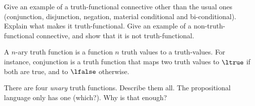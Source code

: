 \documentclass[../../../include/open-logic-section]{subfiles}
\begin{document}


\begin{prob}
    \citep[1.1 item 1]{MacFarlane-2020-PhilosophicalLogicContemporary}
    Give an example of a truth-functional connective other than the
usual ones (conjunction, disjunction, negation, material conditional
and bi-conditional). Explain what makes it truth-functional. Give an
example of a non-truth-functional connective, and show that it is not
truth-functional.
\end{prob}

\begin{prob}
    A $n$-ary truth function is a function $n$ truth values to
    a truth-values. For instance, conjunction is a truth function that
    maps two truth values to $\ltrue$ if both are true, and to $\lfalse$
    otherwise.

    There are four \emph{unary} truth functions. Describe them all. 
    The propositional language only has one (which?). Why is that enough?
\end{prob}
\end{document}
